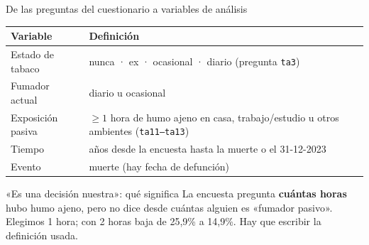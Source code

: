 \documentclass[aspectratio=169,11pt]{beamer}
\begin{document}
\begin{frame}{De las preguntas del cuestionario a variables de análisis}
\begin{tabular}{@{}p{}p{}@{}}
\toprule
\textbf{Variable} & \textbf{Definición}\\
\midrule
Estado de tabaco & nunca · ex · ocasional · diario (pregunta \texttt{ta3})\\[.3em]
Fumador actual & diario u ocasional\\[.3em]
Exposición pasiva & \alert{$\geq 1$ hora} de humo ajeno en casa, trabajo/estudio u otros ambientes (\texttt{ta11--ta13})\\[.3em]
Tiempo & años desde la encuesta hasta la muerte o el 31-12-2023\\[.3em]
Evento & muerte (hay fecha de defunción)\\
\bottomrule
\end{tabular}
\vspace{.4em}
\begin{alertblock}{«Es una decisión nuestra»: qué significa}
La encuesta pregunta \textbf{cuántas horas} hubo humo ajeno, pero no dice desde cuántas alguien es «fumador pasivo».
Elegimos 1 hora; con 2 horas baja de 25,9\% a 14,9\%. Hay que escribir la definición usada.
\end{alertblock}
\end{frame}
\end{document}
